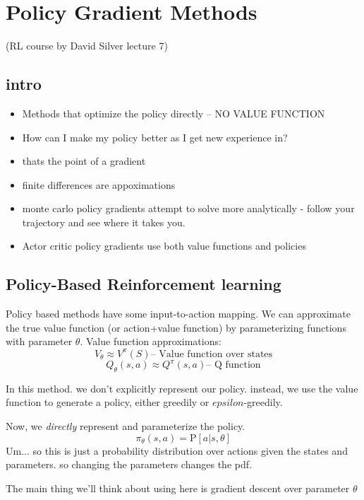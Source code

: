 \documentclass[11pt]{article}
\begin{document}
\section{Policy Gradient Methods} (RL course by David Silver lecture 7)
\subsection{intro}
\begin{itemize}
\item Methods that optimize the policy directly -- NO VALUE FUNCTION
\item How can I make my policy better as I get new experience in?
\item thats the point of a gradient
\item finite differences are appoximations
\item monte carlo policy gradients attempt to solve more analytically - follow your
  trajectory and see where it takes you.
\item Actor critic policy gradients use both value functions and policies
\end{itemize}

\subsection{Policy-Based Reinforcement learning}
Policy based methods have some input-to-action mapping. We can approximate the true
value function (or action+value function) by parameterizing functions with parameter
$\theta$. Value function approximations:
\[V_\theta \approx V^\pi(S) \text{--     Value function over states}\]
\[Q_\theta(s,a) \approx Q^\pi(s,a) \text{--     Q function}\]

In this method. we don't explicitly represent our policy. instead, we use the value function
to generate a policy, either greedily or $epsilon$-greedily.

Now, we \textit{directly} represent and parameterize the policy.
\[\pi_\theta(s,a) = \mathrm{P}[a|s,\theta]\]
Um... so this is just a probability distribution over actions given the states and parameters.
so changing the parameters changes the pdf.

The main thing we'll think about using here is gradient descent over parameter $\theta$
\end{document}
